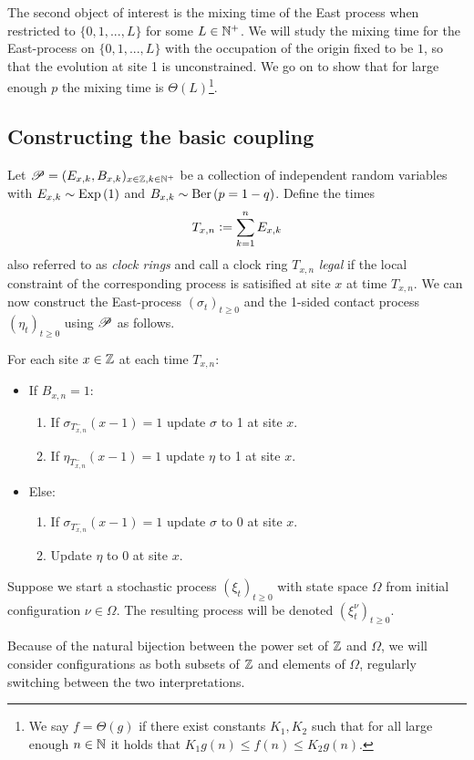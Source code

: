 The second object of interest is the mixing time of the East process when restricted to $\{ 0, 1, ..., L\}$ for some $L \in \mathbb{N}^+$. We will study the mixing time for the East-process on $\{ 0, 1, ..., L\}$ with the occupation of the origin fixed to be $1$, so that the evolution at site 1 is unconstrained. We go on to show that for large enough $p$ the mixing time is $\Theta(L)$\footnote{We say $f = \Theta(g)$ if there exist constants $K_1, K_2$ such that for all large enough $n \in \mathbb{N}$ it holds that $K_1 g(n) \leq f(n) \leq K_2 g(n)$.}. 

\subsection{Constructing the basic coupling}
Let $\mathscr{P} = (E_{x,k}, B_{x,k})_{x \in \mathbb{Z}, k \in \mathbb{N}^+}$ be a collection of independent random variables with $E_{x,k} \sim \text{Exp} \left( 1 \right)$ and $B_{x,k} \sim \text{Ber} \left( p=1-q \right)$. Define the times 
\[
T_{x,n} \vcentcolon= \sum\limits_{k=1}^n E_{x,k}
\]
 also referred to as \textit{clock rings} and call a clock ring $T_{x,n}$ \textit{legal} if the local constraint of the corresponding process is satisified at site $x$ at time $T_{x,n}$. We can now construct the East-process $(\sigma_t)_{t \geq 0}$ and the 1-sided contact process $(\eta_t)_{t \geq 0}$ using $\mathscr{P}$ as follows. 
 
 \newpage 

For each site $x \in \mathbb{Z}$ at each time $T_{x,n}$:
\begin{itemize}
  \item If $B_{x,n} = 1$:
  \begin{enumerate}
  	\item If $\sigma_{T^-_{x,n}} (x-1) = 1$ update $\sigma$ to 1 at site $x$. 
  	\item If $\eta_{T^-_{x,n}} (x-1) = 1$ update $\eta$ to 1 at site $x$. 
  \end{enumerate}
  \item Else:
  \begin{enumerate}
  	\item If $\sigma_{T^-_{x,n}} (x-1) = 1$ update $\sigma$ to 0 at site $x$. 
  	\item Update $\eta$ to 0 at site $x$. 
  \end{enumerate}
\end{itemize}

\begin{notation}
Suppose we start a stochastic process $(\xi_t)_{t \geq 0}$ with state space $\Omega$ from initial configuration $\nu \in \Omega$. The resulting process will be denoted $(\xi^\nu_t)_{t \geq 0}$. 
\end{notation}
\begin{notation}
Because of the natural bijection between the power set of $\mathbb{Z}$ and $\Omega$, we will consider configurations as both subsets of $\mathbb{Z}$ and elements of $\Omega$, regularly switching between the two interpretations. 
\end{notation}

